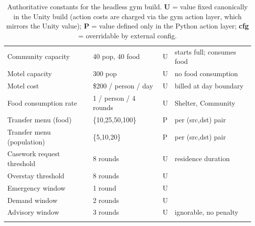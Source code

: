 \documentclass[11pt]{article}
\begin{document}
\begin{longtable}{@{}llll@{}}
Community capacity & 40 pop, 40 food & U & starts full; consumes food \\
Motel capacity & 300 pop & U & no food consumption \\
Motel cost & \$200 / person / day & U & billed at day boundary \\
Food consumption rate & 1 / person / 4 rounds & U & Shelter, Community \\
Transfer menu (food) & \{10,25,50,100\} & P & per (src,dst) pair \\
Transfer menu (population) & \{5,10,20\} & P & per (src,dst) pair \\
Casework request threshold & 8 rounds & U & residence duration \\
Overstay threshold & 8 rounds & U & \\
Emergency window & 1 round & U & \\
Demand window & 2 rounds & U & \\
Advisory window & 3 rounds & U & ignorable, no penalty \\
\bottomrule
\caption{Authoritative constants for the headless gym build. \textbf{U} = value
fixed canonically in the Unity build (action costs are charged via the gym action
layer, which mirrors the Unity value); \textbf{P} = value defined only in the
Python action layer; \textbf{cfg} = overridable by external config.}
\end{longtable}
\end{document}
